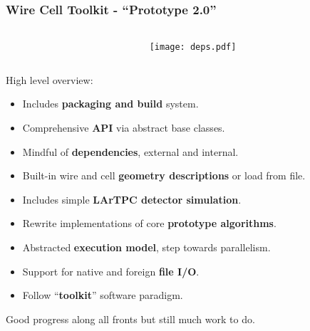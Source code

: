 \documentclass[xcolor=dvipsnames]{beamer}
\begin{document}
\begin{frame}
  \frametitle{Wire Cell Toolkit - ``Prototype 2.0''}
  \begin{columns}
    \begin{column}{0.65\paperwidth}
    \end{column}
    \begin{column}{0.35\paperwidth}
      \vspace{-20mm}
      \texttt{[image: deps.pdf]}      
    \end{column}
  \end{columns}

  \vspace{-15mm}

  High level overview:
  \begin{itemize}
  \item Includes \textbf{packaging and build} system.
  \item Comprehensive \textbf{API} via abstract base classes.
  \item Mindful of \textbf{dependencies}, external and internal.
  \item Built-in wire and cell \textbf{geometry descriptions} or load from file.
  \item Includes simple \textbf{LArTPC detector simulation}.
  \item Rewrite implementations of core \textbf{prototype algorithms}.
  \item Abstracted \textbf{execution model}, step towards parallelism.
  \item Support for native and foreign \textbf{file I/O}.
  \item Follow ``\textbf{toolkit}'' software paradigm.
  \end{itemize}

  \vfill

  Good progress along all fronts but still much work to do.

\end{frame}
\end{document}
